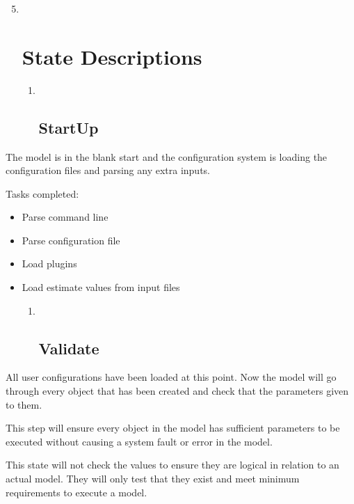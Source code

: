 \documentclass[a4paper,11pt,twoside,pdftex,draft]{article}
\begin{document}
\begin{enumerate}
\setcounter{enumi}{4}
\item ~
  \hypertarget{state-descriptions}{%
  \section{State Descriptions}\label{state-descriptions}}

  \begin{enumerate}
  \item ~
    \hypertarget{startup}{%
    \subsection{StartUp}\label{startup}}
  \end{enumerate}
\end{enumerate}

The model is in the blank start and the configuration system is loading
the configuration files and parsing any extra inputs.

Tasks completed:

\begin{itemize}
\item
  Parse command line
\item
  Parse configuration file
\item
  Load plugins
\item
  Load estimate values from input files

  \begin{enumerate}
  \item ~
    \hypertarget{validate}{%
    \subsection{Validate}\label{validate}}
  \end{enumerate}
\end{itemize}

All user configurations have been loaded at this point. Now the model
will go through every object that has been created and check that the
parameters given to them.

This step will ensure every object in the model has sufficient
parameters to be executed without causing a system fault or error in the
model.

This state will not check the values to ensure they are logical in
relation to an actual model. They will only test that they exist and
meet minimum requirements to execute a model.
\end{document}
